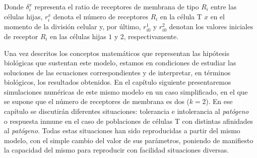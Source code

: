 Donde $\delta_{i}^{x}$ representa el ratio de receptores de membrana de tipo $R_{i}$ entre las células hijas, $r_{i}^{x}$ denota el número de receptores $R_{i}$ en la célula T $x$ en el momento de la división celular y, por último, $r_{i0}^{1}$ y $r_{i0}^{2}$ denotan los valores iniciales de receptor $R_{i}$ en las células hijas $1$ y $2$, respectivamente.


Una vez descritos los conceptos matemáticos que representan las hipótesis biológicas que sustentan este modelo, estamos en condiciones de estudiar las soluciones de las ecuaciones correspondientes y de interpretar, en términos biológicos, los resultados obtenidos. En el capítulo siguiente presentaremos simulaciones numéricas de este mismo modelo en un caso simplificado, en el que se supone que el número de receptores de membrana es dos ($k = 2$). En ese capítulo se discutirán diferentes situaciones: tolerancia e intolerancia al \textit{patógeno} o respuesta inmune en el caso de poblaciones de células T con distintas afinidades al \textit{patógeno}. Todas estas situaciones han sido reproducidas a partir del mismo modelo, con el simple cambio del valor de sus parámetros, poniendo de manifiesto la capacidad del mismo para reproducir con facilidad situaciones diversas. 


%


